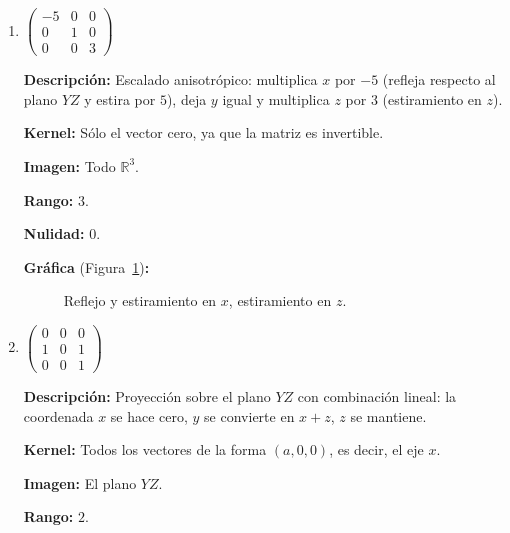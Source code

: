 \begin{prob}
\begin{enumerate}[$a)$]
    \item $\begin{pmatrix} -5 & 0 & 0 \\ 0 & 1 & 0 \\ 0 & 0 & 3 \end{pmatrix}$
    \begin{myproof}
    \textbf{Descripción:} Escalado anisotrópico: multiplica $x$ por $-5$ (refleja respecto al plano $YZ$ y estira por $5$), deja $y$ igual y multiplica $z$ por $3$ (estiramiento en $z$).

    \textbf{Kernel:} Sólo el vector cero, ya que la matriz es invertible.

    \textbf{Imagen:} Todo $\mathbb{R}^3$.

    \textbf{Rango:} $3$.

    \textbf{Nulidad:} $0$.

    \textbf{Gráfica} (Figura~\ref{fig:sudoku_escalado})\textbf{:}
    \begin{figure}[H]
    \centering
    \caption{Reflejo y estiramiento en $x$, estiramiento en $z$.}\label{fig:sudoku_escalado}
    \end{figure}
    \end{myproof}
    
    \item $\begin{pmatrix} 0 & 0 & 0 \\ 1 & 0 & 1 \\ 0 & 0 & 1 \end{pmatrix}$
    \begin{myproof}
    \textbf{Descripción:} Proyección sobre el plano $YZ$ con combinación lineal: la coordenada $x$ se hace cero, $y$ se convierte en $x+z$, $z$ se mantiene.

    \textbf{Kernel:} Todos los vectores de la forma $(a,0,0)$, es decir, el eje $x$.

    \textbf{Imagen:} El plano $YZ$.

    \textbf{Rango:} $2$.


\end{myproof}
\end{enumerate}
\end{prob}
